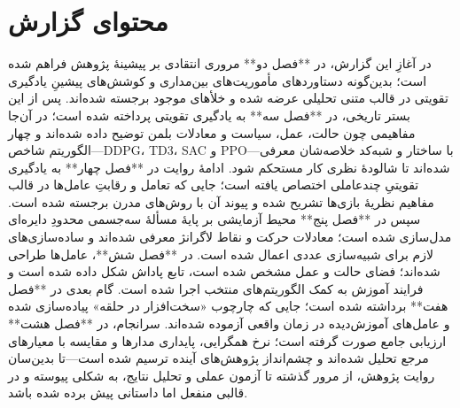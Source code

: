 \section{محتوای گزارش}
در آغازِ این گزارش، در **فصل دو** مروری انتقادی بر پیشینهٔ پژوهش فراهم شده است؛ بدین‌گونه دستاوردهای مأموریت‌های بین‌مداری و کوشش‌های پیشینِ یادگیری تقویتی در قالب متنی تحلیلی عرضه شده و خلأهای موجود برجسته شده‌اند. پس از این بستر تاریخی، در **فصل سه** به یادگیری تقویتی پرداخته شده است؛ در آن‌جا مفاهیمی چون حالت، عمل، سیاست و معادلات بلمن توضیح داده شده‌اند و چهار الگوریتم شاخص—DDPG، TD3، SAC و PPO—با ساختار و شبه‌کد خلاصه‌شان معرفی شده‌اند تا شالودهٔ نظری کار مستحکم شود. ادامهٔ روایت در **فصل چهار** به یادگیری تقویتیِ چندعاملی اختصاص یافته است؛ جایی که تعامل و رقابتِ عامل‌ها در قالب مفاهیم نظریهٔ بازی‌ها تشریح شده و پیوند آن با روش‌های مدرن برجسته شده است. سپس در **فصل پنج** محیط آزمایشی بر پایهٔ مسألهٔ سه‌جسمی محدودِ دایره‌ای مدل‌سازی شده است؛ معادلات حرکت و نقاط لاگرانژ معرفی شده‌اند و ساده‌سازی‌های لازم برای شبیه‌سازی عددی اعمال شده است. در **فصل شش**، عامل‌ها طراحی شده‌اند؛ فضای حالت و عمل مشخص شده است، تابع پاداش شکل داده شده است و فرایند آموزش به کمک الگوریتم‌های منتخب اجرا شده است. گام بعدی در **فصل هفت** برداشته شده است؛ جایی که چارچوب «سخت‌افزار در حلقه» پیاده‌سازی شده و عامل‌های آموزش‌دیده در زمان واقعی آزموده شده‌اند. سرانجام، در **فصل هشت** ارزیابی جامع صورت گرفته است؛ نرخ همگرایی، پایداری مدارها و مقایسه با معیارهای مرجع تحلیل شده‌اند و چشم‌انداز پژوهش‌های آینده ترسیم شده است—تا بدین‌سان روایت پژوهش، از مرور گذشته تا آزمون عملی و تحلیل نتایج، به شکلی پیوسته و در قالبی منفعل اما داستانی پیش برده شده باشد.
